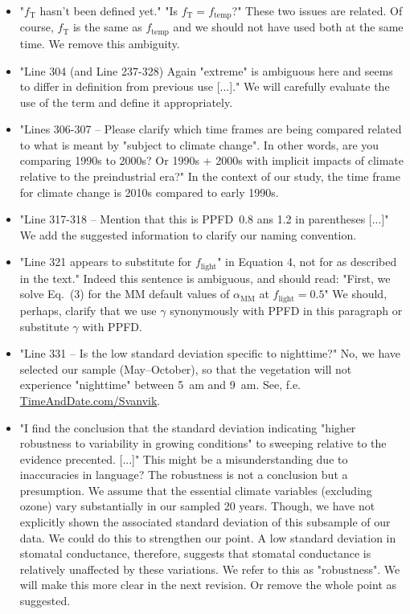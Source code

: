 \documentclass{scrartcl}
\begin{document}
\begin{itemize}
    \item {\color{blue} "$f_\mathrm{T}$ hasn't been defined yet." "Is $f_\mathrm{T} = f_\mathrm{temp}$?"} These two issues are related. Of course, $f_\mathrm{T}$ is the same as $f_\mathrm{temp}$ and we should not have used both at the same time. We remove this ambiguity.
    \item {\color{blue} "Line 304 (and Line 237-328) Again "extreme" is ambiguous here and seems to differ in definition from previous use [...]."} We will carefully evaluate the use of the term and define it appropriately.
    \item {\color{blue} "Lines 306-307 -- Please clarify which time frames are being compared related to what is meant by "subject to climate change". In other words, are you comparing 1990s to 2000s? Or 1990s + 2000s with implicit impacts of climate relative to the preindustrial era?"} In the context of our study, the time frame for climate change is 2010s compared to early 1990s.
    \item {\color{blue} "Line 317-318 -- Mention that this is PPFD~0.8 ans 1.2 in parentheses [...]"} We add the suggested information to clarify our naming convention.
    \item {\color{blue} "Line 321 appears to substitute for $f_\mathrm{light}$" in Equation 4, not for as described in the text."} Indeed this sentence is ambiguous, and should read: "First, we solve Eq.~(3) for the MM default values of $\alpha_\mathrm{MM}$ at $f_\mathrm{light}=0.5$" We should, perhaps, clarify that we use $\gamma$ synonymously with PPFD in this paragraph or substitute $\gamma$ with PPFD.
    \item {\color{blue} "Line 331 -- Is the low standard deviation specific to nighttime?"} No, we have selected our sample (May--October), so that the vegetation will not experience "nighttime" between 5~am and 9~am. See, f.e. \href{https://www.timeanddate.com/sun/@777232}{TimeAndDate.com/Svanvik}.
    \item {\color{blue} "I find the conclusion that the standard deviation indicating "higher robustness to variability in growing conditions" to sweeping relative to the evidence precented. [...]"} This might be a misunderstanding due to inaccuracies in language? The robustness is not a conclusion but a presumption. We assume that the essential climate variables (excluding ozone) vary substantially in our sampled 20 years. Though, we have not explicitly shown the associated standard deviation of this subsample of our data. We could do this to strengthen our point. A low standard deviation in stomatal conductance, therefore, suggests that stomatal conductance is relatively unaffected by these variations. We refer to this as "robustness". We will make this more clear in the next revision. Or remove the whole point as suggested.

\end{itemize}
\end{document}
